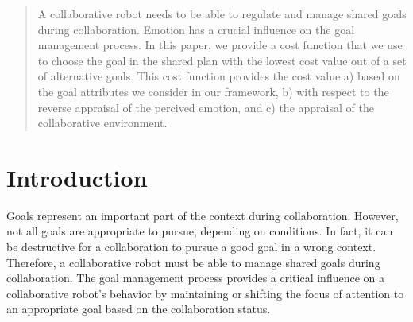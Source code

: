\documentclass[conference]{IEEEtran}
\begin{document}




\maketitle

\begin{abstract}
A collaborative robot needs to be able to regulate and manage shared goals
during collaboration. Emotion has a crucial influence on the goal management
process. In this paper, we provide a cost function that we use to choose the
goal in the shared plan with the lowest cost value out of a set of alternative
goals. This cost function provides the cost value a) based on the goal
attributes we consider in our framework, b) with respect to the reverse
appraisal of the percived emotion, and c) the appraisal of the collaborative
environment.
\end{abstract}





%
\IEEEpeerreviewmaketitle

\vspace*{-2mm}
\section{Introduction}
\vspace*{-2mm}

Goals represent an important part of the context during collaboration. However,
not all goals are appropriate to pursue, depending on conditions. In fact, it
can be destructive for a collaboration to pursue a good goal in a wrong context.
Therefore, a collaborative robot must be able to manage shared goals during
collaboration. The goal management process provides a critical influence on a
collaborative robot's behavior by maintaining or shifting the focus of attention
to an appropriate goal based on the collaboration status.
\end{document}
